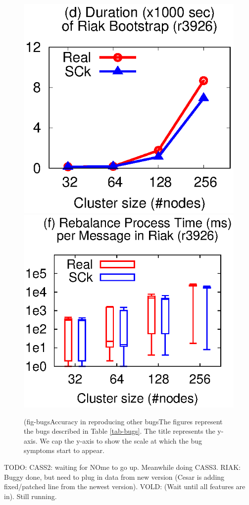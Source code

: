 \begin{figure}
\centerline{
\includegraphics[width=\fgw]{F/old-bugs/eps/riak1.eps}
\includegraphics[width=\fgw]{F/riak/eps/proc.eps}
}

\vminfive

({fig-bugs}{Accuracy in
reproducing other bugs}{The figures represent the bugs described in Table
\ref{tab-bugs}.  The title represents the y-axis.  We cap the y-axis to show
the scale at which the bug symptoms start to appear. }
\vminfive
\end{figure}




TODO: CASS2: waiting for NOme to go up.
Meanwhile doing CASS3. 
%
RIAK: Buggy done, but need to plug in data from new version
(Cesar is adding fixed/patched line from the newest version).
%
VOLD: (Wait until all features are in).  Still running.
\fi
